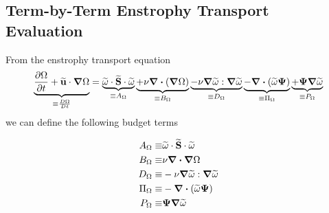 \newcommand{\pienst}{\Pi_{\Omega}}
\newcommand{\penst}{P_{\Omega}}
\newcommand{\aenst}{A_{\Omega}}
\newcommand{\benst}{B_{\Omega}}
\newcommand{\denst}{D_{\Omega}}
\newcommand{\matderv}[1]{\frac{D#1}{Dt}}

\subsection{Term-by-Term Enstrophy Transport Evaluation}
From the enstrophy transport equation
\begin{equation}
    \underbrace{\pdv{\Omega}{t} + \widetilde{\mathbf{u}} \cdot \grad{\Omega}}_{\equiv \matderv{\Omega}} =
        \underbrace{\widetilde{\mathbf{\omega}} \cdot \widetilde{\mathbf{S}} \cdot \widetilde{\mathbf{\omega}}}_{\equiv A_{\Omega}}
        \underbrace{+ \nu \div \left(\grad{\Omega}\right)}_{\equiv B_{\Omega}}
        \underbrace{- \nu \grad{\widetilde{\omega}} : \grad{\widetilde{\omega}}}_{\equiv D_{\Omega}}
        \underbrace{- \div\left(\widetilde{\mathbf{\omega}} \mathbf{\Psi}\right)}_{\equiv \Pi_{\Omega}} 
        \underbrace{+ \mathbf{\Psi} \grad{\widetilde{\omega}}}_{\equiv P_{\Omega}} 
        \label{eq:enstrophy-transport}
\end{equation}
we can define the following budget terms


\begin{subequations}
    \begin{align}
        A_{\Omega} \equiv &
            \widetilde{\mathbf{\omega}} 
            \cdot \widetilde{\mathbf{S}} 
            \cdot \widetilde{\mathbf{\omega}}   \\
        B_{\Omega} \equiv &
            \nu \div{\grad{\Omega}} \\
        D_{\Omega} \equiv &
            - \nu \grad{\widetilde{\omega}} : \grad{\widetilde{\omega}} \\
        \Pi_{\Omega} \equiv &
            -\div\left(\widetilde{\mathbf{\omega}} \mathbf{\Psi}\right) \\
        P_{\Omega} \equiv &
            \mathbf{\Psi} \grad{\widetilde{\omega}}
    \end{align}
\end{subequations}

